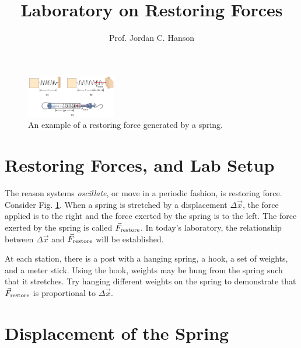 \documentclass{article}
\begin{document}
\title{Laboratory on Restoring Forces}
\author{Prof. Jordan C. Hanson}

\maketitle

\begin{figure}[ht]
\centering
\includegraphics[width=0.35\textwidth]{figures/force1.png}
\caption{\label{fig:restore} An example of a restoring force generated by a spring.}
\end{figure}

\section{Restoring Forces, and Lab Setup}

The reason systems \textit{oscillate}, or move in a periodic fashion, is restoring force.  Consider Fig. \ref{fig:restore}.  When a spring is stretched by a displacement $\Delta \vec{x}$, the force applied is to the right and the force exerted by the spring is to the left.  The force exerted by the spring is called $\vec{F}_{\rm restore}$.  In today's laboratory, the relationship between $\Delta \vec{x}$ and $\vec{F}_{\rm restore}$ will be established.

At each station, there is a post with a hanging spring, a hook, a set of weights, and a meter stick.  Using the hook, weights may be hung from the spring such that it stretches.  Try hanging different weights on the spring to demonstrate that $\vec{F}_{\rm restore}$ is proportional to $\Delta \vec{x}$.

\section{Displacement of the Spring}
\end{document}
